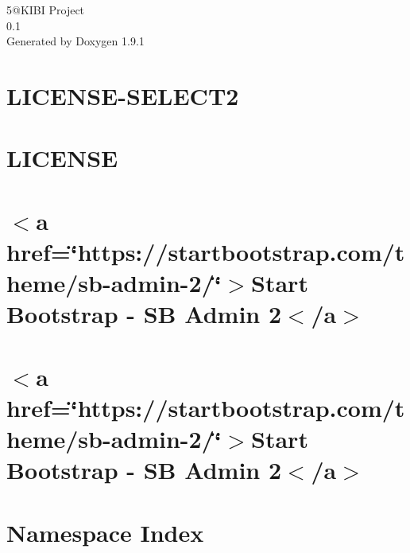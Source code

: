 \let\mypdfximage\pdfximage\def\pdfximage{\immediate\mypdfximage}\documentclass[twoside]{book}
\newcommand{\+}{\discretionary{\mbox{\scriptsize$\hookleftarrow$}}{}{}}
\newcommand{\clearemptydoublepage}{%
  \newpage{\pagestyle{empty}\cleardoublepage}%
}
\begin{document}
\raggedbottom

\hypersetup{pageanchor=false,
             bookmarksnumbered=true,
             pdfencoding=unicode
            }
\begin{titlepage}
\vspace*{7cm}
\begin{center}%
{\Large 5@KIBI Project \\[1ex]\large 0.\+1 }\\
\vspace*{1cm}
{\large Generated by Doxygen 1.9.1}\\
\end{center}
\end{titlepage}
\clearemptydoublepage
{}
\tableofcontents
\clearemptydoublepage
{}
\hypersetup{pageanchor=true}

\chapter{LICENSE-\/\+SELECT2}
\label{md_Static_admin_css_vendor_select2_LICENSE_SELECT2}

\chapter{LICENSE}
\label{md_Static_admin_js_vendor_select2_LICENSE}

\chapter{$<$a href=\char`\"{}https\+://startbootstrap.\+com/theme/sb-\/admin-\/2/\char`\"{}$>$Start Bootstrap -\/ SB Admin 2$<$/a$>$}
\label{md_Templates_ORG_sb_admin_2_README}

\chapter{$<$a href=\char`\"{}https\+://startbootstrap.\+com/theme/sb-\/admin-\/2/\char`\"{}$>$Start Bootstrap -\/ SB Admin 2$<$/a$>$}
\label{md_Templates_README}

\chapter{Namespace Index}

\end{document}
